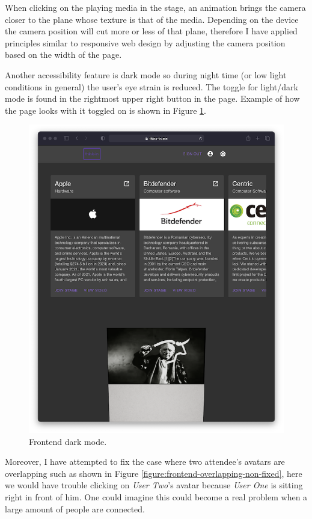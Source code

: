 When clicking on the playing media in the stage, an animation brings the camera closer to the plane whose texture is that of the media. Depending on the device the camera position will cut more or less of that plane, therefore I have applied principles similar to responsive web design by adjusting the camera position based on the width of the page.

Another accessibility feature is dark mode so during night time (or low light conditions in general) the user's eye strain is reduced. The toggle for light/dark mode is found in the rightmost upper right button in the page. Example of how the page looks with it toggled on is shown in Figure \ref{figure:frontend-darkmode}.

\begin{figure}[H]
	\centering
	\includegraphics[width=.99\textwidth,keepaspectratio]{images/frontend/darkmode.png}
	\caption{Frontend dark mode.}
	\label{figure:frontend-darkmode}
\end{figure}


Moreover, I have attempted to fix the case where two attendee's avatars are overlapping such as shown in Figure \ref{figure:frontend-overlapping-non-fixed}, here we would have trouble clicking on \textit{User Two}'s avatar because \textit{User One} is sitting right in front of him. One could imagine this could become a real problem when a large amount of people are connected.


